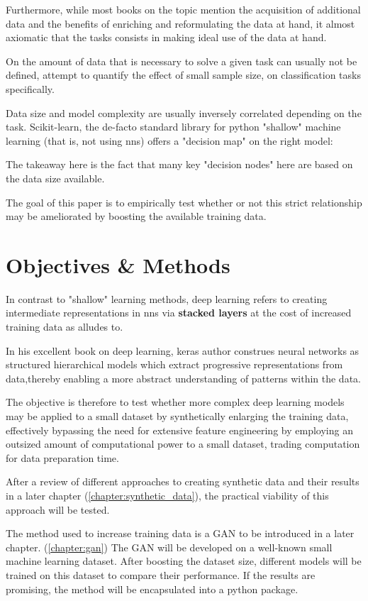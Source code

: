 Furthermore, while most books on the topic mention the acquisition of additional data and the benefits of enriching and reformulating the data at hand, it almost axiomatic that the tasks consists in making ideal use of the data at hand.

On the amount of data that is necessary to solve a given task can usually not be defined, \cite{raudys1991small} attempt to quantify the effect of small sample size, on classification tasks specifically.

\pagebreak

Data size and model complexity are usually inversely correlated depending on the task. Scikit-learn, the de-facto standard library for python "shallow" machine learning (that is, not using \acp{nn}) offers a "decision map" on the right model:


The takeaway here is the fact that many key "decision nodes" here are based on the data size available.

The goal of this paper is to empirically test whether or not this strict relationship may be ameliorated by boosting the available training data.

\pagebreak

\section{Objectives \& Methods}

In contrast to "shallow" learning methods, deep learning refers to creating intermediate representations in \acp{nn} via \textbf{stacked layers} at the cost of increased training data as \cite{swingler1996applying} alludes to.

In his excellent book on deep learning, keras author \cite{chollet2017deep} construes neural networks as structured hierarchical models which extract progressive representations from data,thereby enabling a more abstract understanding of patterns within the data.

The objective is therefore to test whether more complex deep learning models may be applied to a small dataset by synthetically enlarging the training data, effectively bypassing the need for extensive feature engineering by employing an outsized amount of computational power to a small dataset, trading computation for data preparation time.

After a review of different approaches to creating synthetic data and their results in a later chapter (\ref{chapter:synthetic_data}), the practical viability of this approach will be tested.

The method used to increase training data is a \ac{GAN} to be introduced in a later chapter. (\ref{chapter:gan})
The \ac{GAN} will be developed on a well-known small machine learning dataset. After boosting the dataset size, different models will be trained on this dataset to compare their performance. If the results are promising, the method will be encapsulated into a python package.
